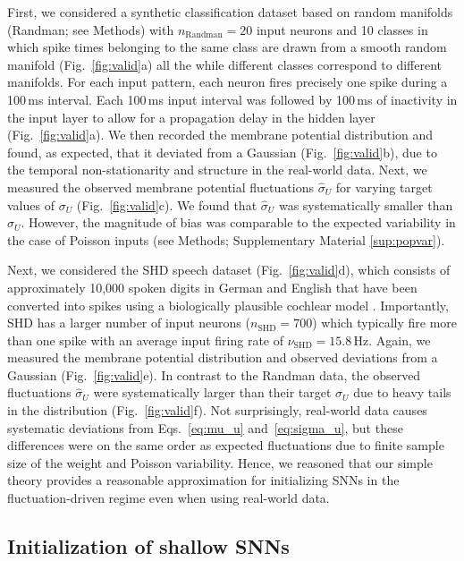 \documentclass[11pt,a4paper]{article}
\begin{document}
First, we considered a synthetic classification dataset based on random manifolds \citep{Zenke2021-zg} (Randman; see Methods) with $n_{\mathrm{Randman}}=20$ input neurons and 10 classes in which spike times belonging to the same class are drawn from a smooth random manifold (Fig.~\ref{fig:valid}a) all the while different classes
correspond to different manifolds.
For each input pattern, each neuron fires precisely one spike during a 100\,ms
interval.
Each 100\,ms input interval was followed by 100\,ms of inactivity in the input
layer to allow for a propagation delay in the hidden layer
(Fig.~\ref{fig:valid}a).
We then recorded the membrane potential distribution and found, 
as expected, that it deviated from a Gaussian (Fig.~\ref{fig:valid}b), due to the temporal
non-stationarity and structure in the real-world data.
Next, we measured the observed membrane potential fluctuations $\hat \sigma_U$
for varying target values of $\sigma_U$ (Fig.~\ref{fig:valid}c).
We found that $\hat \sigma_U$ was systematically smaller than $\sigma_U$.
However, the magnitude of bias was comparable to the expected variability in
the case of Poisson inputs (see Methods; Supplementary Material
\ref{sup:popvar}).

Next, we considered the \ac{SHD} speech dataset (Fig.~\ref{fig:valid}d), which
consists of approximately 10,000 spoken digits in German and English that have
been converted into spikes using a biologically plausible cochlear model
\citep{cramer_heidelberg_2020}.  
Importantly, \ac{SHD} has a larger number of input neurons
($n_{\mathrm{SHD}}=700$) which typically fire more than one
spike with an average input firing rate of $\nu_{\mathrm{SHD}}=15.8$\,Hz.
Again, we measured the membrane potential distribution and observed deviations
from a Gaussian (Fig.~\ref{fig:valid}e).
In contrast to the Randman data, the observed fluctuations $\hat
\sigma_U$ were systematically larger than their target $\sigma_U$ due to heavy
tails in the distribution (Fig.~\ref{fig:valid}f).
Not surprisingly, real-world data causes systematic deviations from Eqs.~\eqref{eq:mu_u}
and~\eqref{eq:sigma_u},
but these differences were on the same order as expected fluctuations due to
finite sample size of the weight and Poisson variability.
Hence, we reasoned that our simple theory provides a reasonable approximation
for initializing \acp{SNN} in the fluctuation-driven regime even when using
real-world data.



\subsection*{Initialization of shallow \acp{SNN}}
\end{document}
